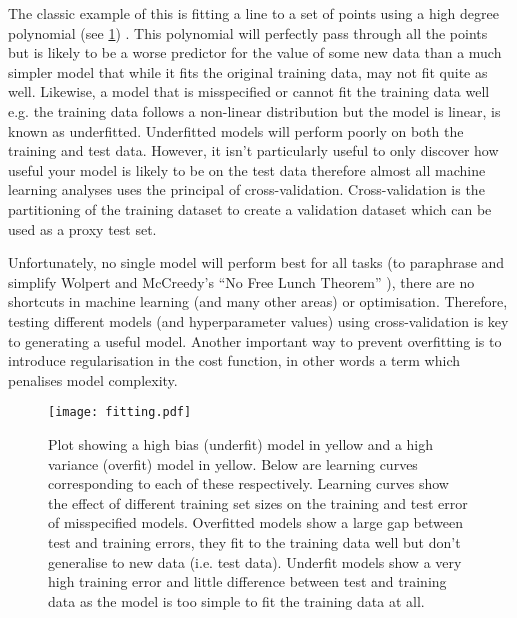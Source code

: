 The classic example of this is fitting a line to a set of points using a
high degree polynomial (see \cref{fig:fitting}) .  This polynomial will perfectly pass through all the points but is likely to be a worse predictor for the value 
of some new data than a much simpler model that while it fits the original training data, may not fit quite as well.  
Likewise, a model that is misspecified
or cannot fit the training data well e.g. the training data follows a non-linear distribution but the model is linear, is known as underfitted.
Underfitted models will perform poorly on both the training and test data.  However, it isn't particularly useful to only discover
how useful your model is likely to be on the test data therefore almost all machine learning analyses uses the principal of cross-validation.
Cross-validation is the partitioning of the training dataset to create a validation dataset which can be used as a proxy test set.


Unfortunately, no single model will perform best for all tasks (to paraphrase and simplify Wolpert and McCreedy's ``No Free Lunch Theorem'' \citep{Wolpert1996}),
there are no shortcuts in machine learning (and many other areas) or optimisation.  Therefore, testing different models (and hyperparameter values) using
cross-validation is key to generating a useful model.  Another important way to prevent overfitting is to introduce regularisation in the cost function, in other
words a term which penalises model complexity.

\begin{figure}[h]
    \texttt{[image: fitting.pdf]}
    \caption[Explanation of learning curves and fitting]{Plot showing a high bias (underfit) model in yellow and a high variance (overfit) model in yellow.
        Below are learning curves corresponding to each of these respectively.
        Learning curves show the effect of different training set sizes on the training and test error of misspecified models.
        Overfitted models show a large gap between test and training errors, they fit to the training data well but don't generalise
        to new data (i.e. test data).
        Underfit models show a very high training error and little difference between test and training data as the model is too simple
        to fit the training data at all.
    }
    \label{fig:fitting}
\end{figure}




